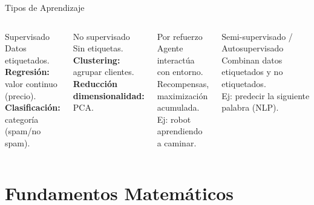 \documentclass[aspectratio=169, 10pt, xcolor=table]{beamer}
\begin{document}
\begin{frame}{Tipos de Aprendizaje}
    \begin{columns}[t]
        \begin{exampleblock}{Supervisado}
            Datos etiquetados. \\
            \textbf{Regresión:} valor continuo (precio). \\
            \textbf{Clasificación:} categoría (spam/no spam).
        \end{exampleblock}
        \vspace{0.2cm}
        \begin{exampleblock}{No supervisado}
            Sin etiquetas. \\
            \textbf{Clustering:} agrupar clientes. \\
            \textbf{Reducción dimensionalidad:} PCA.
        \end{exampleblock}

        \begin{exampleblock}{Por refuerzo}
            Agente interactúa con entorno. \\
            Recompensas, maximización acumulada. \\
            Ej: robot aprendiendo a caminar.
        \end{exampleblock}
        \vspace{0.2cm}
        \begin{exampleblock}{Semi-supervisado / Autosupervisado}
            Combinan datos etiquetados y no etiquetados. \\
            Ej: predecir la siguiente palabra (NLP).
        \end{exampleblock}
    \end{columns}
\end{frame}

\section{Fundamentos Matemáticos}
\end{document}
